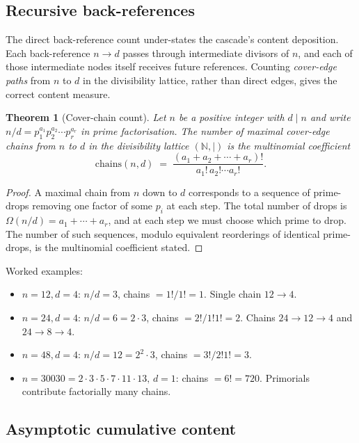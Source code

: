 \documentclass[11pt,a4paper]{article}
\newtheorem{theorem}{Theorem}[section]
\begin{document}
\subsection*{Recursive back-references}

The direct back-reference count under-states the cascade's content
deposition. Each back-reference $n \to d$ passes through intermediate
divisors of $n$, and each of those intermediate nodes itself receives
future references. Counting \emph{cover-edge paths} from $n$ to $d$
in the divisibility lattice, rather than direct edges, gives the
correct content measure.

\begin{theorem}[Cover-chain count]\label{thm:chain-count}
Let $n$ be a positive integer with $d \mid n$ and write
$n/d = p_1^{a_1} p_2^{a_2} \cdots p_r^{a_r}$ in prime factorisation.
The number of maximal cover-edge chains from $n$ to $d$ in the
divisibility lattice $(\mathbb{N}, \mid)$ is the multinomial
coefficient
\[
\mathrm{chains}(n, d) \;=\; \frac{(a_1 + a_2 + \cdots + a_r)!}{a_1!\, a_2! \cdots a_r!}.
\]
\end{theorem}

\begin{proof}
A maximal chain from $n$ down to $d$ corresponds to a sequence of
prime-drops removing one factor of some $p_i$ at each step. The
total number of drops is $\Omega(n/d) = a_1 + \cdots + a_r$, and at
each step we must choose which prime to drop. The number of such
sequences, modulo equivalent reorderings of identical prime-drops,
is the multinomial coefficient stated.
\end{proof}

\noindent Worked examples:
\begin{itemize}
\item $n = 12, d = 4$: $n/d = 3$, chains $= 1!/1! = 1$. Single chain
$12 \to 4$.
\item $n = 24, d = 4$: $n/d = 6 = 2 \cdot 3$, chains $= 2!/1!1! = 2$.
Chains $24 \to 12 \to 4$ and $24 \to 8 \to 4$.
\item $n = 48, d = 4$: $n/d = 12 = 2^2 \cdot 3$, chains $= 3!/2!1!
= 3$.
\item $n = 30030 = 2 \cdot 3 \cdot 5 \cdot 7 \cdot 11 \cdot 13,\,
d = 1$: chains $= 6! = 720$. Primorials contribute factorially many
chains.
\end{itemize}

\subsection*{Asymptotic cumulative content}
\end{document}
